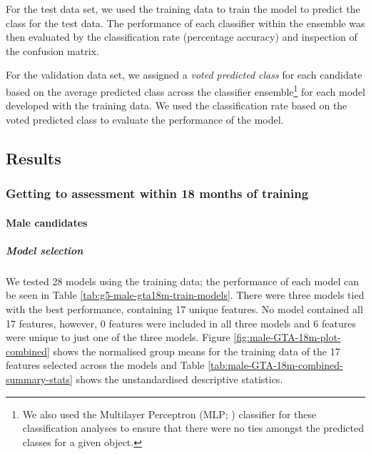 \documentclass[a4paper,]{book}
\let\oldparagraph\paragraph
\renewcommand{\paragraph}[1]{\oldparagraph{#1}\mbox{}}
\let\oldsubparagraph\subparagraph
\renewcommand{\subparagraph}[1]{\oldsubparagraph{#1}\mbox{}}
\begin{document}
For the test data set, we used the training data to train the model to predict the class for the test data. The performance of each classifier within the ensemble was then evaluated by the classification rate (percentage accuracy) and inspection of the confusion matrix.

For the validation data set, we assigned a \emph{voted predicted class} for each candidate based on the average predicted class across the classifier ensemble\footnote{We also used the Multilayer Perceptron (MLP; \citet{Bishop2006}) classifier for these classification analyses to ensure that there were no ties amongst the predicted classes for a given object.} for each model developed with the training data. We used the classification rate based on the voted predicted class to evaluate the performance of the model.

\hypertarget{results-1}{%
\subsection{Results}\label{results-1}}

\hypertarget{getting-to-assessment-within-18-months-of-training}{%
\subsubsection{Getting to assessment within 18 months of training}\label{getting-to-assessment-within-18-months-of-training}}

\hypertarget{male-candidates}{%
\paragraph{Male candidates}\label{male-candidates}}

\hypertarget{model-selection-1}{%
\subparagraph{Model selection}\label{model-selection-1}}

We tested 28 models using the training data; the performance of each model can be seen in Table \ref{tab:g5-male-gta18m-train-models}. There were three models tied with the best performance, containing 17 unique features. No model contained all 17 features, however, 0 features were included in all three models and 6 features were unique to just one of the three models. Figure \ref{fig:male-GTA-18m-plot-combined} shows the normalised group means for the training data of the 17 features selected across the models and Table \ref{tab:male-GTA-18m-combined-summary-stats} shows the unstandardised descriptive statistics.
\end{document}
